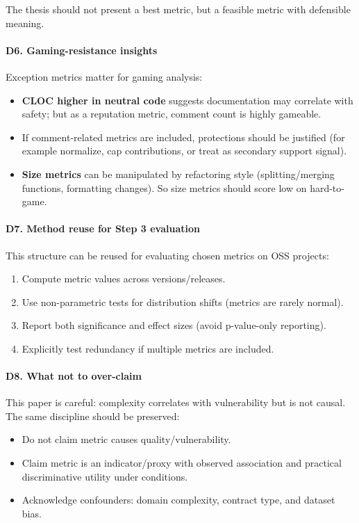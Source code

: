 \documentclass[11pt,a4paper]{article}
\begin{document}
The thesis should not present a best metric, but a feasible metric with defensible meaning.

\paragraph{D6. Gaming-resistance insights}
Exception metrics matter for gaming analysis:
\begin{itemize}[leftmargin=*]
  \item \textbf{CLOC higher in neutral code} suggests documentation may correlate with safety; but as a reputation metric, comment count is highly gameable.
  \item If comment-related metrics are included, protections should be justified (for example normalize, cap contributions, or treat as secondary support signal).
  \item \textbf{Size metrics} can be manipulated by refactoring style (splitting/merging functions, formatting changes). So size metrics should score low on hard-to-game.
\end{itemize}

\paragraph{D7. Method reuse for Step 3 evaluation}
This structure can be reused for evaluating chosen metrics on OSS projects:
\begin{enumerate}[leftmargin=*]
  \item Compute metric values across versions/releases.
  \item Use non-parametric tests for distribution shifts (metrics are rarely normal).
  \item Report both significance and effect sizes (avoid p-value-only reporting).
  \item Explicitly test redundancy if multiple metrics are included.
\end{enumerate}

\paragraph{D8. What not to over-claim}
This paper is careful: complexity correlates with vulnerability but is not causal. The same discipline should be preserved:
\begin{itemize}[leftmargin=*]
  \item Do not claim metric causes quality/vulnerability.
  \item Claim metric is an indicator/proxy with observed association and practical discriminative utility under conditions.
  \item Acknowledge confounders: domain complexity, contract type, and dataset bias.
\end{itemize}
\end{document}
